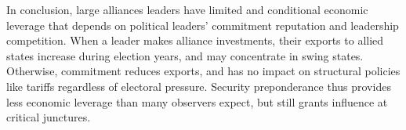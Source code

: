 \documentclass[12pt]{article}
\begin{document}
In conclusion, large alliances leaders have limited and conditional economic leverage that depends on political leaders' commitment reputation and leadership competition. 
When a leader makes alliance investments, their exports to allied states increase during election years, and may concentrate in swing states. 
Otherwise, commitment reduces exports, and has no impact on structural policies like tariffs regardless of electoral pressure. 
Security preponderance thus provides less economic leverage than many observers expect, but still grants influence at critical junctures.


\newpage
\singlespace
 
 
\end{document}
